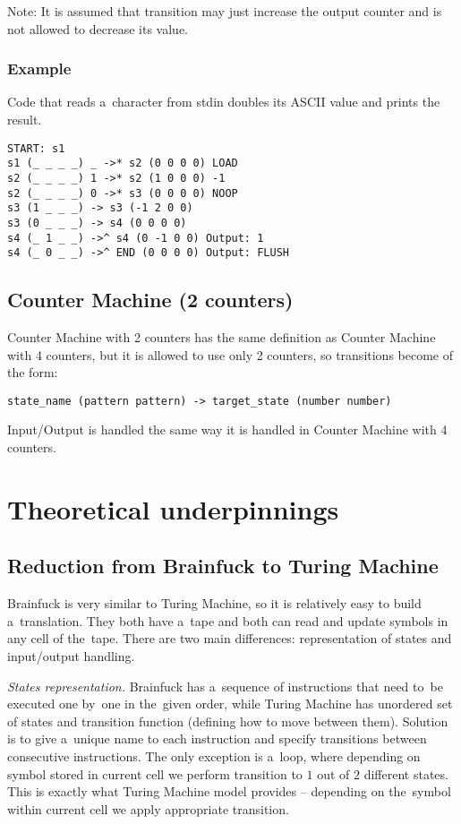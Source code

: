 \documentclass[english,shortabstract,mgr]{iithesis}
\begin{document}
Note: It is assumed that transition may just increase the output counter
and is not allowed to decrease its value.


\subsection{Example}

Code that reads a~character from stdin doubles its ASCII value and prints the result.
\begin{verbatim}
START: s1
s1 (_ _ _ _) _ ->* s2 (0 0 0 0) LOAD
s2 (_ _ _ _) 1 ->* s2 (1 0 0 0) -1
s2 (_ _ _ _) 0 ->* s3 (0 0 0 0) NOOP
s3 (1 _ _ _) -> s3 (-1 2 0 0)
s3 (0 _ _ _) -> s4 (0 0 0 0)
s4 (_ 1 _ _) ->^ s4 (0 -1 0 0) Output: 1
s4 (_ 0 _ _) ->^ END (0 0 0 0) Output: FLUSH
\end{verbatim}

\section {Counter Machine (2 counters)}

Counter Machine with 2 counters has the same definition as
Counter Machine with 4 counters, but it is allowed to use only
2 counters, so transitions become of the form:

\begin{verbatim}
state_name (pattern pattern) -> target_state (number number)
\end{verbatim}

Input/Output is handled the same way it is handled in Counter Machine with 4 counters.


\chapter{Theoretical underpinnings}

\section {Reduction from Brainfuck to Turing Machine}

Brainfuck is very similar to Turing Machine, so it is relatively easy to build
a~translation. They both have a~tape and both can read and update symbols in any
cell of the~tape. There are two main differences: representation of states and
input/output handling.

\textit{States representation.}
Brainfuck has a~sequence of instructions that need to~be
executed one by~one in the~given order, while Turing Machine has unordered set
of states and transition function (defining how to move between them). Solution
is to give a~unique name to each instruction and specify transitions between
consecutive instructions. The only exception is a~loop, where depending on
symbol stored in current cell we perform transition to $1$ out of $2$ different states.
This is exactly what Turing Machine model provides -- depending on the~symbol
within current cell we apply appropriate transition.
\end{document}
